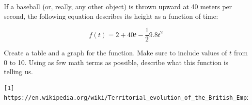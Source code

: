 \begin{exercise}
If a baseball (or, really, any other object) is thrown upward at 40 meters per second, the following equation describes its height as a function of time:

$$f(t) = 2 + 40t - \frac{1}{2}9.8t^2$$

Create a table and a graph for the function.  Make sure to include values of $t$ from 0 to 10.  Using as few math terms as possible, describe what this function is telling us.

\end{exercise}
\bigskip


\begin{verbatim}
[1] https://en.wikipedia.org/wiki/Territorial_evolution_of_the_British_Empire#/media/File:Riseandfall1.PNG
\end{verbatim}